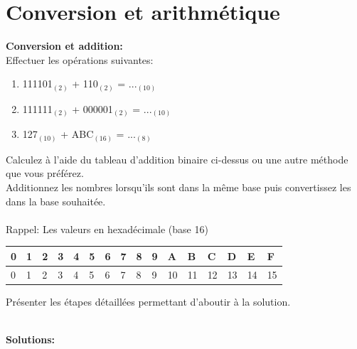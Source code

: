 \section{Conversion et arithmétique}
\begin{Exercice}[20 minutes] \textbf{Conversion et addition:}\\
    Effectuer les opérations suivantes:
    \begin{enumerate}
        \item 111101$_{(2)}$ + 110$_{(2)}$ = ...$_{(10)}$
        \item 111111$_{(2)}$ + 000001$_{(2)}$ = ...$_{(10)}$
        \item 127$_{(10)}$ + ABC$_{(16)}$ = ...$_{(8)}$
    \end{enumerate}
    \begin{conseil}
        Calculez à l'aide du tableau d'addition binaire ci-dessus ou une autre méthode que vous préférez.\\
        Additionnez les nombres lorsqu'ils sont dans la même base puis convertissez les dans la base souhaitée.\\\\
        Rappel: Les valeurs en hexadécimale (base 16)\\
        \begin{tabular}{| C{0.030\textwidth} | C{0.030\textwidth} | C{0.030\textwidth} | C{0.030\textwidth} | C{0.030\textwidth} | C{0.030\textwidth} | C{0.030\textwidth} | C{0.030\textwidth} | C{0.030\textwidth} | C{0.030\textwidth} | C{0.030\textwidth} | C{0.030\textwidth} | C{0.030\textwidth} | C{0.030\textwidth} | C{0.030\textwidth} | C{0.030\textwidth} |} 
            \hline
            \textbf{0} & \textbf{1} & \textbf{2} & \textbf{3} & \textbf{4} & \textbf{5} & \textbf{6} & \textbf{7} & \textbf{8} & \textbf{9} & \textbf{A} & \textbf{B} & \textbf{C} & \textbf{D} & \textbf{E} & \textbf{F}\\ [0.5ex]
             & 1 & 2 & 3 & 4 & 5 & 6 & 7 & 8 & 9 & 10 & 11 & 12 & 13 & 14 & 15 \\ [0.5ex] 
            \hline
        \end{tabular}        
    \end{conseil}
    \begin{solution}
        Présenter les étapes détaillées permettant d'aboutir à la solution.
    \end{solution}
    \textbf{\\ \faTerminal  Solutions:}
    

\end{Exercice}
